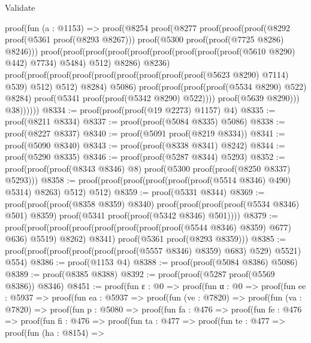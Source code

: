 \begin{lexlean}{Validate}
\begin{coremodule}
      proof(fun (a : @1153) =>
        proof(@8254
            proof(@8277
                proof(proof(proof(@8292 proof(@5361 proof(@8293 @8267)))
                      proof(@5300 proof(proof(@7725 @8286) @8246)))
                    proof(proof(proof(proof(proof(proof(proof(proof(proof(@5610 @8290) @442) @7734)
                                  @5484)
                                @512)
                              @8286)
                            @8236)
                          proof(proof(proof(proof(proof(proof(proof(proof(proof(@5623 @8290) @7114)
                                          @539)
                                        @512)
                                      @512)
                                    @8284)
                                  @5086)
                                proof(proof(proof(proof(@5534 @8290) @522) @8284)
                                    proof(@5341 proof(proof(@5342 @8290) @522))))
                              proof(@5639 @8290)))
                        @38))))))
@8334 := proof(proof(proof(@19 @2273) @1157) @4)
@8335 := proof(@8211 @8334)
@8337 := proof(proof(@5084 @8335) @5086)
@8338 := proof(@8227 @8337)
@8340 := proof(@5091 proof(@8219 @8334))
@8341 := proof(@5090 @8340)
@8343 := proof(proof(@8338 @8341) @8242)
@8344 := proof(@5290 @8335)
@8346 := proof(proof(@5287 @8344) @5293)
@8352 := proof(proof(proof(@8343 @8346) @8) proof(@5300 proof(proof(@8250 @8337) @5293)))
@8358 := proof(proof(proof(proof(proof(proof(@5514 @8346) @490) @5314) @8263) @512) @512)
@8359 := proof(@5331 @8344)
@8369 := proof(proof(proof(@8358 @8359) @8340)
      proof(proof(proof(proof(@5534 @8346) @501) @8359)
          proof(@5341 proof(proof(@5342 @8346) @501))))
@8379 := proof(proof(proof(proof(proof(proof(proof(proof(@5544 @8346) @8359) @677) @636) @5519)
          @8262)
        @8341)
      proof(@5361 proof(@8293 @8359)))
@8385 := proof(proof(proof(proof(proof(proof(@5557 @8346) @8359) @683) @529) @5521) @554)
@8386 := proof(@1153 @4)
@8388 := proof(proof(@5084 @8386) @5086)
@8389 := proof(@8385 @8388)
@8392 := proof(proof(@5287 proof(@5569 @8386)) @8346)
@8451 := proof(fun {ε : @0} =>
    proof(fun {α : @0} =>
      proof(fun {ee : @5937} =>
        proof(fun {ea : @5937} =>
          proof(fun (ve : @7820) =>
            proof(fun (va : @7820) =>
              proof(fun {p : @5080} =>
                proof(fun {fa : @476} =>
                  proof(fun {fe : @476} =>
                    proof(fun {fi : @476} =>
                      proof(fun {ta : @477} =>
                        proof(fun {te : @477} =>
                          proof(fun (ha : @8154) =>

\end{coremodule}
\end{lexlean}
